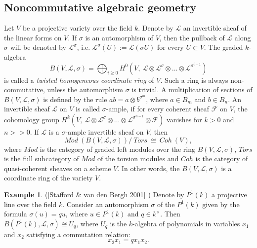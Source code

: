 \documentclass[10pt, reqno]{amsart}
\theoremstyle{definition}
\newtheorem{example}[theorem]{Example}
\theoremstyle{remark}
\numberwithin{equation}{section}
\begin{document}
\subsection{Noncommutative algebraic geometry}
Let $V$ be a projective variety over the field $k$.  Denote by $\mathcal{L}$ an invertible
sheaf of the linear forms on $V$.  If $\sigma$ is an automorphism of $V$,  then
the pullback of $\mathcal{L}$ along $\sigma$ will be denoted by $\mathcal{L}^{\sigma}$,
i.e. $\mathcal{L}^{\sigma}(U):= \mathcal{L}(\sigma U)$ for every $U\subset V$. 
The graded $k$-algebra
\begin{equation}\label{eq2.1}
B(V, \mathcal{L}, \sigma)=\bigoplus_{i\ge 0} H^0\left(V, ~\mathcal{L}\otimes \mathcal{L}^{\sigma}\otimes\dots
\otimes  \mathcal{L}^{\sigma^{ i-1}}\right)
\end{equation}
is called a {\it twisted homogeneous coordinate ring} of $V$.  Such a ring is 
always non-commutative,  unless the automorphism $\sigma$ is trivial. 
A multiplication of sections of  $B(V, \mathcal{L}, \sigma)$ is defined by the 
rule  $ab=a\otimes b^{\sigma^m}$,   where $a\in B_m$ and $b\in B_n$.
An invertible sheaf $\mathcal{L}$ on $V$  is called $\sigma$-ample, if for 
every coherent sheaf $\mathcal{F}$ on $V$,
 the cohomology group $H^k(V, ~\mathcal{L}\otimes \mathcal{L}^{\sigma}\otimes\dots
\otimes  \mathcal{L}^{\sigma^{ n-1}}\otimes \mathcal{F})$  vanishes for $k>0$ and
$n>>0$.   If $\mathcal{L}$ is a $\sigma$-ample invertible sheaf on $V$,  then
\begin{equation}\label{eq2.2}
Mod~(B(V, \mathcal{L}, \sigma)) / ~Tors ~\cong ~Coh~(V),
\end{equation}
where  $Mod$ is the category of graded left modules over the ring $B(V, \mathcal{L}, \sigma)$,
$Tors$ is the full subcategory of $Mod$ of the torsion  modules and  $Coh$ is the category of 
quasi-coherent sheaves on a scheme $V$.  In other words, the $B(V, \mathcal{L}, \sigma)$  is  
a coordinate ring of the variety $V$.
\begin{example}\label{ex2.1}
([Stafford \& van den Bergh 2001]  \cite[p.173]{StaVdb1})
Denote by $P^1(k)$  a projective line over the field $k$.
Consider an automorphism $\sigma$ of the $P^1(k)$
given by the formula $\sigma(u)=qu$, where $u\in P^1(k)$
and $q\in k^{\times}$.  Then  $B(P^1(k), \mathcal{L}, \sigma)\cong U_q$,
where   $U_q$  is  the $k$-algebra of polynomials in 
variables $x_1$ and $x_2$ satisfying  a commutation relation:
\begin{equation}\label{eq2.3}
x_2x_1=qx_1x_2.
\end{equation}
\end{example}
\end{document}

